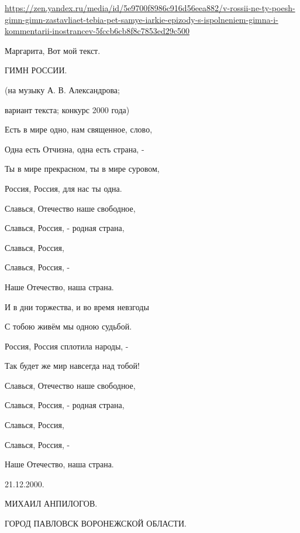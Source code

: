  
 
 
 
 

\url{https://zen.yandex.ru/media/id/5e9700f8986c916d56eea882/v-rossii-ne-ty-poesh-gimn-gimn-zastavliaet-tebia-pet-samye-iarkie-epizody-s-ispolneniem-gimna-i-kommentarii-inostrancev-5fccb6cb8f8c7853ed29c500}

Маргарита, Вот мой текст.

ГИМН РОССИИ.

(на музыку А. В. Александрова;

вариант текста; конкурс 2000 года)

Есть в мире одно, нам священное, слово,

Одна есть Отчизна, одна есть страна, -

Ты в мире прекрасном, ты в мире суровом,

Россия, Россия, для нас ты одна.

Славься, Отечество наше свободное,

Славься, Россия, - родная страна,

Славься, Россия,

Славься, Россия, -

Наше Отечество, наша страна.

И в дни торжества, и во время невзгоды

С тобою живём мы одною судьбой.

Россия, Россия сплотила народы, -

Так будет же мир навсегда над тобой!

Славься, Отечество наше свободное,

Славься, Россия, - родная страна,

Славься, Россия,

Славься, Россия, -

Наше Отечество, наша страна.

21.12.2000.

МИХАИЛ АНПИЛОГОВ.

ГОРОД ПАВЛОВСК ВОРОНЕЖСКОЙ ОБЛАСТИ.
